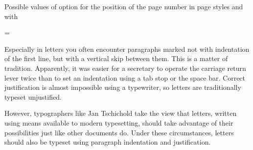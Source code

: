 \begin{table}
  \caption[{Possible values of option  with
    }]{Possible values of option  for the
    position of the page number in page styles  and
     with }
 \label{tab:scrlttr2.pagenumber}
  \begin{desctabular}
  \end{desctabular}
\end{table}
%
%

\begin{Declaration}
  =
\end{Declaration}%
%
\begin{Explain}%
  Especially in letters you often encounter paragraphs marked not with
  indentation of the first line, but with a vertical skip between
  them. This is a matter of tradition. Apparently, it was easier for a
  secretary to operate the carriage return lever twice than to set an
  indentation using a tab stop or the space bar. Correct justification
  is almost impossible using a typewriter, so letters are
  traditionally typeset unjustified.

  However, typographers like Jan Tschichold take the view that
  letters, written using means available to modern typesetting, should
  take advantage of their possibilities just like other documents
  do. Under these circumstances, letters should also be typeset using
  paragraph indentation and justification.
\end{Explain}

